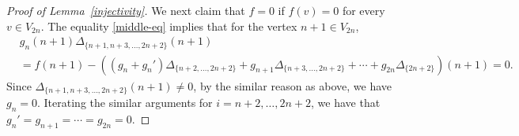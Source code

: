 \documentclass[10pt,a4paper]{amsart}
\begin{document}
\begin{proof}[Proof of Lemma~\ref{injectivity}]
We next claim that $f=0$ if $f(v)=0$ for every $v\in V_{2n}$.
The equality \eqref{middle-eq} implies that for the vertex $n+1\in V_{2n}$,
\begin{align*}
&g_{n}(n+1)\Delta_{\{n+1,n+3,\ldots, 2n+2\}}(n+1) \\
&=f(n+1)-\left((g_{n}+g_{n}')\Delta_{\{n+2,\ldots, 2n+2\}}+g_{n+1}\Delta_{\{n+3,\ldots, 2n+2\}}+\cdots 
+g_{2n}\Delta_{\{2n+2\}}\right)(n+1)=0.
\end{align*}
Since $\Delta_{\{n+1,n+3,\ldots, 2n+2\}}(n+1)\not=0$, by the similar reason as above, we have $g_{n}=0$.
Iterating the similar arguments for $i=n+2,\ldots, 2n+2$, 
we have that $g_{n}'=g_{n+1}=\cdots =g_{2n}=0$.

\end{proof}
\end{document}
